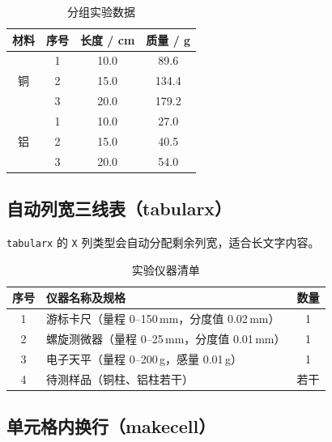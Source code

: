 \documentclass{Phyport}
\begin{document}
\begin{table}[H]
    \centering
    \caption{分组实验数据}
    \label{tab:multirow}
    \begin{tabular}{cccc}
        \toprule
        材料 & 序号 & 长度 / cm & 质量 / g \\
        \midrule
        \multirow{3}{*}{铜} & 1 & 10.0 & 89.6 \\
                            & 2 & 15.0 & 134.4 \\
                            & 3 & 20.0 & 179.2 \\
        \midrule
        \multirow{3}{*}{铝} & 1 & 10.0 & 27.0 \\
                            & 2 & 15.0 & 40.5 \\
                            & 3 & 20.0 & 54.0 \\
        \bottomrule
    \end{tabular}
\end{table}

\subsection{自动列宽三线表（tabularx）}

\texttt{tabularx} 的 \texttt{X} 列类型会自动分配剩余列宽，适合长文字内容。

\begin{table}[H]
    \centering
    \caption{实验仪器清单}
    \label{tab:tabularx}
    \begin{tabularx}{\linewidth}{c X c}
        \toprule
        序号 & 仪器名称及规格 & 数量 \\
        \midrule
        1 & 游标卡尺（量程 0--150\,mm，分度值 0.02\,mm） & 1 \\
        2 & 螺旋测微器（量程 0--25\,mm，分度值 0.01\,mm） & 1 \\
        3 & 电子天平（量程 0--200\,g，感量 0.01\,g） & 1 \\
        4 & 待测样品（铜柱、铝柱若干） & 若干 \\
        \bottomrule
    \end{tabularx}
\end{table}

\subsection{单元格内换行（makecell）}
\end{document}
